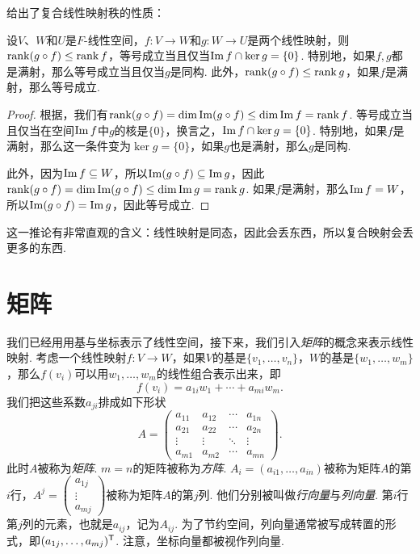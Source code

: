  给出了复合线性映射秩的性质：
\begin{corollary}\label{cor:rank-composition}
设$V$、$W$和$U$是$F$-线性空间，$f:V\to W$和$g:W\to U$是两个线性映射，则$\operatorname*{rank} (g\circ f)\leq \operatorname*{rank} f$，等号成立当且仅当$\operatorname*{Im} f\cap \ker g=\{0\}$. 特别地，如果$f,g$都是满射，那么等号成立当且仅当$g$是同构. 此外，$\operatorname*{rank} (g\circ f)\leq \operatorname*{rank} g$，如果$f$是满射，那么等号成立. 
\end{corollary}
\begin{proof}
    根据，我们有$\operatorname*{rank} (g\circ f)=\dim\operatorname*{Im} (g\circ f)\leq \dim \operatorname*{Im} f=\operatorname*{rank} f$. 等号成立当且仅当在空间$\operatorname*{Im} f$中$g$的核是$\{0\}$，换言之，$\operatorname*{Im} f\cap \ker g=\{0\}$. 特别地，如果$f$是满射，那么这一条件变为$\ker g=\{0\}$，如果$g$也是满射，那么$g$是同构. 
    
    此外，因为$\operatorname*{Im} f\subseteq W$，所以$\operatorname*{Im} (g\circ f)\subseteq \operatorname*{Im} g$，因此$\operatorname*{rank} (g\circ f)=\dim\operatorname*{Im} (g\circ f)\leq \dim \operatorname*{Im} g=\operatorname*{rank} g$. 如果$f$是满射，那么$\operatorname*{Im} f=W$，所以$\operatorname*{Im} (g\circ f)=\operatorname*{Im} g$，因此等号成立. 
\end{proof}
这一推论有非常直观的含义：线性映射是同态，因此会丢东西，所以复合映射会丢更多的东西. 

\section{矩阵}

我们已经用用基与坐标表示了线性空间，接下来，我们引入\emph{矩阵}的概念来表示线性映射. 考虑一个线性映射$f:V\to W$，如果$V$的基是$\{v_1,\dots,v_n\}$，$W$的基是$\{w_1,\dots,w_m\}$，那么$f(v_i)$可以用$w_1,\dots,w_m$的线性组合表示出来，即
\[f(v_i)=a_{1i}w_1+\cdots+a_{mi}w_m.\]
我们把这些系数$a_{ji}$排成如下形状
\[A=\begin{pmatrix}
a_{11}&a_{12}&\cdots&a_{1n}\\
a_{21}&a_{22}&\cdots&a_{2n}\\
\vdots&\vdots&\ddots&\vdots\\
a_{m1}&a_{m2}&\cdots&a_{mn}
\end{pmatrix}.\]
此时$A$被称为\emph{矩阵}. $m=n$的矩阵被称为\emph{方阵}. $A_i=(a_{i1},\dots,a_{in})$被称为矩阵$A$的第$i$行，$A^j=\begin{pmatrix}a_{1j}\\\vdots\\a_{mj}\end{pmatrix}$被称为矩阵$A$的第$j$列. 他们分别被叫做\emph{行向量}与\emph{列向量}. 第$i$行第$j$列的元素，也就是$a_{ij}$，记为$A_{ij}$. 为了节约空间，列向量通常被写成转置的形式，即$(a_{1j},\dots,a_{mj})^{\mathsf{T}}$. 注意，坐标向量都被视作列向量. 

